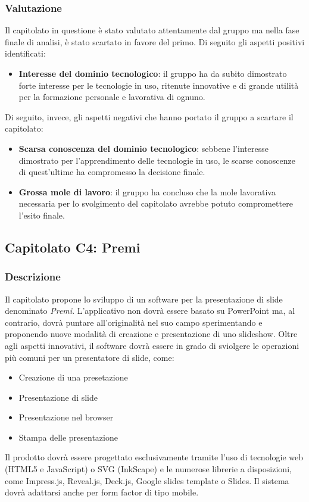 \subsubsection{Valutazione}
Il capitolato in questione è stato valutato attentamente dal gruppo ma nella fase finale di analisi, è stato scartato in favore del primo. Di seguito gli aspetti positivi identificati:
\begin{itemize}
\item \textbf{Interesse del dominio tecnologico}: il gruppo ha da subito dimostrato forte interesse per le tecnologie in uso, ritenute innovative e di grande utilità per la formazione personale e lavorativa di ognuno.
\end{itemize}
Di seguito, invece, gli aspetti negativi che hanno portato il gruppo a scartare il capitolato:
\begin{itemize}
\item \textbf{Scarsa conoscenza del dominio tecnologico}: sebbene l'interesse dimostrato per l'apprendimento delle tecnologie in uso, le scarse conoscenze di quest'ultime ha compromesso la decisione finale.
\item \textbf{Grossa mole di lavoro}: il gruppo ha concluso che la mole lavorativa necessaria per lo svolgimento del capitolato avrebbe potuto compromettere l'esito finale.
\end{itemize}


\subsection{Capitolato C4: Premi}

\subsubsection{Descrizione}
Il capitolato propone lo sviluppo di un software per la presentazione di slide denominato \emph{Premi}. L'applicativo non dovrà essere basato su PowerPoint ma, al contrario, dovrà puntare all'originalità nel suo campo sperimentando e proponendo nuove modalità di creazione e presentazione di uno slideshow. Oltre agli aspetti innovativi, il software dovrà essere in grado di sviolgere le operazioni più comuni per un presentatore di slide, come:
\begin{itemize}
\item Creazione di una presetazione
\item Presentazione di slide
\item Presentazione nel browser
\item Stampa delle presentazione
\end{itemize}
Il prodotto dovrà essere progettato esclusivamente tramite l'uso di tecnologie web (HTML5 e JavaScript) o SVG (InkScape) e le numerose librerie a disposizioni, come Impress.js, Reveal.js, Deck.js, Google slides template o Slides. Il sistema dovrà adattarsi anche per form factor di tipo mobile.

